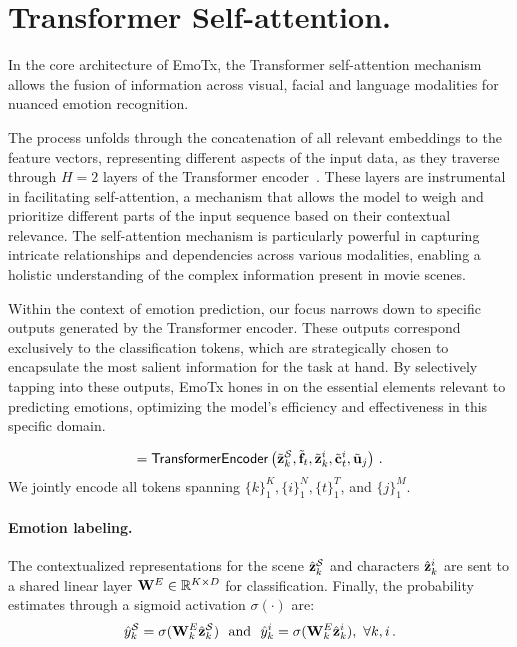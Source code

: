 \section{Transformer Self-attention.}
\label{sec:transformer}

In the core architecture of EmoTx, the Transformer self-attention mechanism allows the fusion of information across visual, facial and language modalities for nuanced emotion recognition.

The process unfolds through the concatenation of all relevant embeddings to the feature vectors, representing different aspects of the input data, as they traverse through $H{=}2$ layers of the Transformer encoder~\cite{attention}. These layers are instrumental in facilitating self-attention, a mechanism that allows the model to weigh and prioritize different parts of the input sequence based on their contextual relevance. The self-attention mechanism is particularly powerful in capturing intricate relationships and dependencies across various modalities, enabling a holistic understanding of the complex information present in movie scenes.

Within the context of emotion prediction, our focus narrows down to specific outputs generated by the Transformer encoder. These outputs correspond exclusively to the classification tokens, which are strategically chosen to encapsulate the most salient information for the task at hand. By selectively tapping into these outputs, EmoTx hones in on the essential elements relevant to predicting emotions, optimizing the model's efficiency and effectiveness in this specific domain.

\begin{equation}
[\hat{\bz}_k^{\MS}, \hat{\bz}_k^i] = \mathsf{TransformerEncoder} \left( \tilde{\bz}_k^{\MS}, \tilde{\bbf}_t, \tilde{\bz}_k^i, \tilde{\bc}_t^i, \tilde{\bu}_j \right) \, .
\end{equation}
We jointly encode all tokens spanning $\{k\}_1^K, \{i\}_1^N, \{t\}_1^T$, and $\{j\}_1^M$.

\paragraph{Emotion labeling.}
The contextualized representations for the scene $\hat{\mathbf{z}}_k^{\mathcal{S}}$ and characters $\hat{\mathbf{z}}_k^i$ are sent to a shared linear layer $\mathbf{W}^E \in \mathbb{R}^{K \times D}$ for classification.
Finally, the probability estimates through a sigmoid activation $\sigma(\cdot)$ are:
\begin{equation}
\label{eq:predictions}
\hat{y}_k^{\MS} = \sigma( \bW^E_k \hat{\bz}_k^{\MS} ) \,\,
\text{ and } \,\,
\hat{y}_k^i = \sigma( \bW^E_k \hat{\bz}_k^i ), \,\, \forall k, i \, .
\end{equation}
